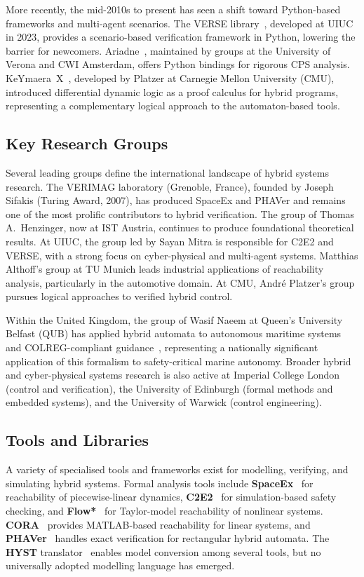 \documentclass[a4paper, 12pt]{report}
\begin{document}
More recently, the mid-2010s to present has seen a shift toward Python-based
frameworks and multi-agent scenarios.  The VERSE library~\cite{Li2023VERSE},
developed at UIUC in 2023, provides a scenario-based verification framework
in Python, lowering the barrier for newcomers.  Ariadne~\cite{Ariadne},
maintained by groups at the University of Verona and CWI Amsterdam, offers
Python bindings for rigorous CPS analysis.  KeYmaera~X~\cite{Platzer2018KeYmaera},
developed by Platzer at Carnegie Mellon University (CMU), introduced
differential dynamic logic as a proof calculus for hybrid programs,
representing a complementary logical approach to the automaton-based tools.

\subsection*{Key Research Groups}

Several leading groups define the international landscape of hybrid systems
research.  The VERIMAG laboratory (Grenoble, France), founded by Joseph
Sifakis (Turing Award, 2007), has produced SpaceEx and PHAVer and remains
one of the most prolific contributors to hybrid verification.  The group of
Thomas A.\ Henzinger, now at IST Austria, continues to produce foundational
theoretical results.  At UIUC, the group led by Sayan Mitra is responsible
for C2E2 and VERSE, with a strong focus on cyber-physical and multi-agent
systems.  Matthias Althoff's group at TU Munich leads industrial applications
of reachability analysis, particularly in the automotive domain.  At CMU,
Andr\'{e} Platzer's group pursues logical approaches to verified hybrid
control.

Within the United Kingdom, the group of Wasif Naeem at Queen's University
Belfast (QUB) has applied hybrid automata to autonomous maritime systems and
COLREG-compliant guidance~\cite{SINGH2026123919}, representing a nationally
significant application of this formalism to safety-critical marine
autonomy.  Broader hybrid and cyber-physical systems research is also active
at Imperial College London (control and verification), the University of
Edinburgh (formal methods and embedded systems), and the University of
Warwick (control engineering).

\subsection*{Tools and Libraries}

A variety of specialised tools and frameworks exist for modelling, verifying,
and simulating hybrid systems.  Formal analysis tools include
\textbf{SpaceEx}~\cite{Frehse2011SpaceEx} for reachability of
piecewise-linear dynamics, \textbf{C2E2}~\cite{Fan2016C2E2} for
simulation-based safety checking, and \textbf{Flow*}~\cite{Chen2013Flow}
for Taylor-model reachability of nonlinear systems.
\textbf{CORA}~\cite{Althoff2010CORA} provides MATLAB-based reachability for
linear systems, and \textbf{PHAVer}~\cite{Frehse2007PHAVer} handles exact
verification for rectangular hybrid automata.  The \textbf{HYST}
translator~\cite{Bak2015HYST} enables model conversion among several tools,
but no universally adopted modelling language has emerged.
\end{document}
